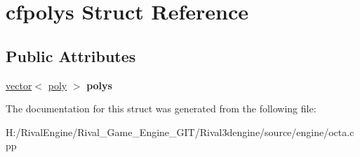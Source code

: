 \hypertarget{structcfpolys}{}\section{cfpolys Struct Reference}
\label{structcfpolys}
\subsection*{Public Attributes}
\begin{DoxyCompactItemize}
\item 
\mbox{\label{structcfpolys_a697b8d4e294303ffe652c5eb85e51283}} 
\hyperlink{structvector}{vector}$<$ \hyperlink{structpoly}{poly} $>$ {\bfseries polys}
\end{DoxyCompactItemize}


The documentation for this struct was generated from the following file\+:\begin{DoxyCompactItemize}
\item 
H\+:/\+Rival\+Engine/\+Rival\+\_\+\+Game\+\_\+\+Engine\+\_\+\+G\+I\+T/\+Rival3dengine/source/engine/octa.\+cpp\end{DoxyCompactItemize}

